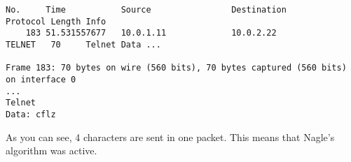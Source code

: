 \begin{verbatim}
No.     Time           Source                Destination           Protocol Length Info
    183 51.531557677   10.0.1.11             10.0.2.22             TELNET   70     Telnet Data ...

Frame 183: 70 bytes on wire (560 bits), 70 bytes captured (560 bits) on interface 0
...
Telnet
Data: cflz
\end{verbatim}

As you can see, 4 characters are sent in one packet. This means that Nagle's algorithm was active.